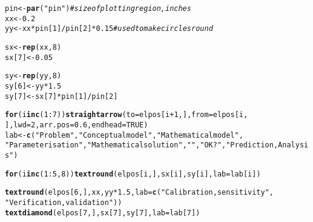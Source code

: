 \documentclass{article}\usepackage[]{graphicx}\usepackage[]{color}
\makeatletter
\newcommand{\hlnum}[1]{\textcolor[rgb]{0.686,0.059,0.569}{#1}}%
\newcommand{\hlstr}[1]{\textcolor[rgb]{0.192,0.494,0.8}{#1}}%
\newcommand{\hlcom}[1]{\textcolor[rgb]{0.678,0.584,0.686}{\textit{#1}}}%
\newcommand{\hlopt}[1]{\textcolor[rgb]{0,0,0}{#1}}%
\newcommand{\hlstd}[1]{\textcolor[rgb]{0.345,0.345,0.345}{#1}}%
\newcommand{\hlkwa}[1]{\textcolor[rgb]{0.161,0.373,0.58}{\textbf{#1}}}%
\newcommand{\hlkwb}[1]{\textcolor[rgb]{0.69,0.353,0.396}{#1}}%
\newcommand{\hlkwc}[1]{\textcolor[rgb]{0.333,0.667,0.333}{#1}}%
\newcommand{\hlkwd}[1]{\textcolor[rgb]{0.737,0.353,0.396}{\textbf{#1}}}%
\newenvironment{kframe}{%
 \def\at@end@of@kframe{}%
 \ifinner\ifhmode%
  \def\at@end@of@kframe{\end{minipage}}%
  \begin{minipage}{\columnwidth}%
 \fi\fi%
 \def\FrameCommand##1{\hskip\@totalleftmargin \hskip-\fboxsep
 \colorbox{shadecolor}{##1}\hskip-\fboxsep
     \hskip-\linewidth \hskip-\@totalleftmargin \hskip\columnwidth}%
 \MakeFramed {\advance\hsize-\width
   \@totalleftmargin\z@ \linewidth\hsize
   \@setminipage}}%
 {\par\unskip\endMakeFramed%
 \at@end@of@kframe}
\newenvironment{knitrout}{}{} %
\makeatother
\begin{document}
\begin{knitrout}
\begin{kframe}
\begin{alltt}
\hlstd{pin} \hlkwb{<-} \hlkwd{par}\hlstd{(}\hlstr{"pin"}\hlstd{)}  \hlcom{# size of plotting region, inches}
\hlstd{xx} \hlkwb{<-} \hlnum{0.2}
\hlstd{yy} \hlkwb{<-} \hlstd{xx} \hlopt{*} \hlstd{pin[}\hlnum{1}\hlstd{]}\hlopt{/}\hlstd{pin[}\hlnum{2}\hlstd{]} \hlopt{*} \hlnum{0.15}  \hlcom{# used to make circles round}

\hlstd{sx} \hlkwb{<-} \hlkwd{rep}\hlstd{(xx,} \hlnum{8}\hlstd{)}
\hlstd{sx[}\hlnum{7}\hlstd{]} \hlkwb{<-} \hlnum{0.05}

\hlstd{sy} \hlkwb{<-} \hlkwd{rep}\hlstd{(yy,} \hlnum{8}\hlstd{)}
\hlstd{sy[}\hlnum{6}\hlstd{]} \hlkwb{<-} \hlstd{yy} \hlopt{*} \hlnum{1.5}
\hlstd{sy[}\hlnum{7}\hlstd{]} \hlkwb{<-} \hlstd{sx[}\hlnum{7}\hlstd{]} \hlopt{*} \hlstd{pin[}\hlnum{1}\hlstd{]}\hlopt{/}\hlstd{pin[}\hlnum{2}\hlstd{]}

\hlkwa{for} \hlstd{(i} \hlkwa{in} \hlkwd{c}\hlstd{(}\hlnum{1}\hlopt{:}\hlnum{7}\hlstd{))} \hlkwd{straightarrow}\hlstd{(}\hlkwc{to} \hlstd{= elpos[i} \hlopt{+} \hlnum{1}\hlstd{, ],} \hlkwc{from} \hlstd{= elpos[i,}
    \hlstd{],} \hlkwc{lwd} \hlstd{=} \hlnum{2}\hlstd{,} \hlkwc{arr.pos} \hlstd{=} \hlnum{0.6}\hlstd{,} \hlkwc{endhead} \hlstd{=} \hlnum{TRUE}\hlstd{)}
\hlstd{lab} \hlkwb{<-} \hlkwd{c}\hlstd{(}\hlstr{"Problem"}\hlstd{,} \hlstr{"Conceptual model"}\hlstd{,} \hlstr{"Mathematical model"}\hlstd{,}
    \hlstr{"Parameterisation"}\hlstd{,} \hlstr{"Mathematical solution"}\hlstd{,} \hlstr{""}\hlstd{,} \hlstr{"OK?"}\hlstd{,} \hlstr{"Prediction, Analysis"}\hlstd{)}

\hlkwa{for} \hlstd{(i} \hlkwa{in} \hlkwd{c}\hlstd{(}\hlnum{1}\hlopt{:}\hlnum{5}\hlstd{,} \hlnum{8}\hlstd{))} \hlkwd{textround}\hlstd{(elpos[i, ], sx[i], sy[i],} \hlkwc{lab} \hlstd{= lab[i])}

\hlkwd{textround}\hlstd{(elpos[}\hlnum{6}\hlstd{, ], xx, yy} \hlopt{*} \hlnum{1.5}\hlstd{,} \hlkwc{lab} \hlstd{=} \hlkwd{c}\hlstd{(}\hlstr{"Calibration,sensitivity"}\hlstd{,}
    \hlstr{"Verification,validation"}\hlstd{))}
\hlkwd{textdiamond}\hlstd{(elpos[}\hlnum{7}\hlstd{, ], sx[}\hlnum{7}\hlstd{], sy[}\hlnum{7}\hlstd{],} \hlkwc{lab} \hlstd{= lab[}\hlnum{7}\hlstd{])}


\end{alltt}
\end{kframe}
\end{knitrout}
\end{document}
